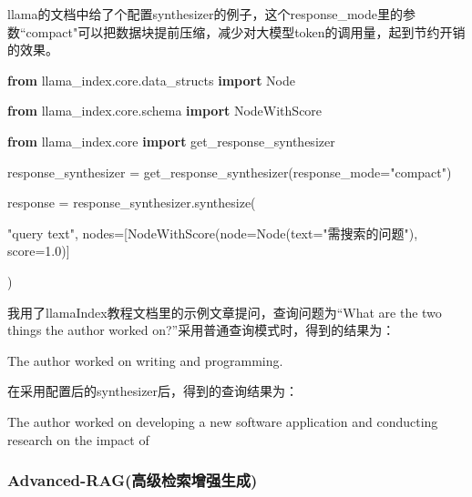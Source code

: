 \documentclass[
]{article}
\newenvironment{Shaded}{}{}
\newcommand{\FloatTok}[1]{\textcolor[rgb]{0.25,0.63,0.44}{#1}}
\newcommand{\ImportTok}[1]{\textcolor[rgb]{0.00,0.50,0.00}{\textbf{#1}}}
\newcommand{\NormalTok}[1]{#1}
\newcommand{\OperatorTok}[1]{\textcolor[rgb]{0.40,0.40,0.40}{#1}}
\newcommand{\StringTok}[1]{\textcolor[rgb]{0.25,0.44,0.63}{#1}}
\begin{document}
llama的文档中给了个配置synthesizer的例子，这个response\_mode里的参数``compact"可以把数据块提前压缩，减少对大模型token的调用量，起到节约开销的效果。

\begin{Shaded}
\begin{Highlighting}[]
\ImportTok{from}\NormalTok{ llama\_index.core.data\_structs }\ImportTok{import}\NormalTok{ Node
}
\ImportTok{from}\NormalTok{ llama\_index.core.schema }\ImportTok{import}\NormalTok{ NodeWithScore
}
\ImportTok{from}\NormalTok{ llama\_index.core }\ImportTok{import}\NormalTok{ get\_response\_synthesizer
}


\NormalTok{response\_synthesizer }\OperatorTok{=}\NormalTok{ get\_response\_synthesizer(response\_mode}\OperatorTok{=}\StringTok{"compact"}\NormalTok{)
}


\NormalTok{response }\OperatorTok{=}\NormalTok{ response\_synthesizer.synthesize(
}
    \StringTok{"query text"}\NormalTok{, nodes}\OperatorTok{=}\NormalTok{[NodeWithScore(node}\OperatorTok{=}\NormalTok{Node(text}\OperatorTok{=}\StringTok{"需搜索的问题"}\NormalTok{), score}\OperatorTok{=}\FloatTok{1.0}\NormalTok{)]
}
\NormalTok{)}
\end{Highlighting}
\end{Shaded}

我用了llamaIndex教程文档里的示例文章提问，查询问题为``What are the two
things the author worked on?''采用普通查询模式时，得到的结果为：

\begin{Shaded}
\begin{Highlighting}[]
\NormalTok{The author worked on writing and programming. }
\end{Highlighting}
\end{Shaded}

在采用配置后的synthesizer后，得到的查询结果为：

\begin{Shaded}
\begin{Highlighting}[]
\NormalTok{The author worked on developing a new software application and conducting research on the impact of}
\end{Highlighting}
\end{Shaded}

\subsubsection{Advanced-RAG(高级检索增强生成)}\label{advanced-ragux9ad8ux7ea7ux68c0ux7d22ux589eux5f3aux751fux6210}
\end{document}
